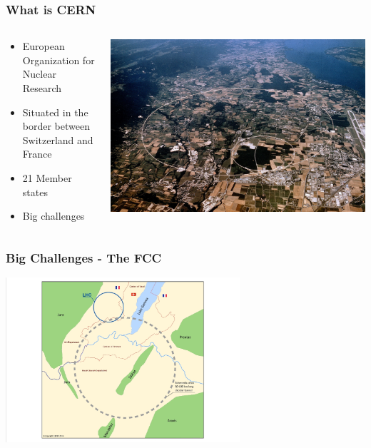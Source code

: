 \documentclass[aspectratio=169]{beamer}
\begin{document}
\begin{frame}

    \frametitle{What is CERN}
    \begin{minipage}[t]{0.95\textwidth}
        \begin{columns}
            \begin{column}{0.5\textwidth}
                \begin{itemize}
                    \item European Organization for Nuclear Research
                    \item Situated in the border between Switzerland and France
                    \item 21 Member states
                    \item Big challenges 
                \end{itemize}
            \end{column}
            \begin{column}{0.5\textwidth}
                \includegraphics[width=1.1\textwidth]{CernMap.jpg}
            \end{column}
        \end{columns}
    \end{minipage}

\end{frame}


\begin{frame}
    \frametitle{Big Challenges - The FCC}
    \begin{center}
    \includegraphics[width=0.65\textwidth,trim=4 4 4 4,clip]{CERN_LCC.jpg}
\end{center}
\end{frame}
\end{document}
